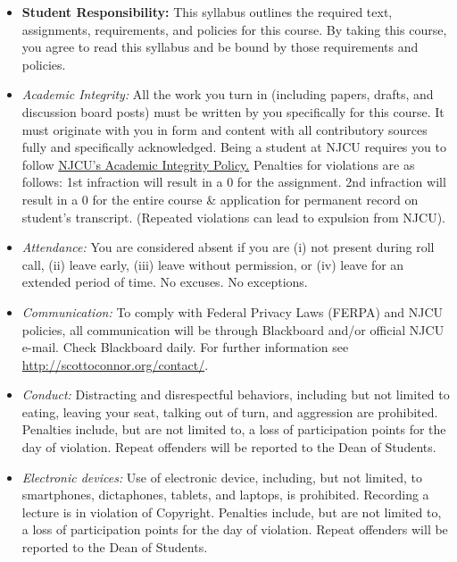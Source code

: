 \documentclass[article,oneside]{memoir}
\begin{document}
\begin{itemize}

\item \textbf{Student Responsibility:} This syllabus outlines the required text, assignments, requirements, and policies for this course. By taking this course, you agree to read this syllabus and be bound by those requirements and policies. 

 \item \textit{Academic Integrity:} All the work you turn in (including papers, drafts, and discussion board posts) must be written by you specifically for this course. It must originate with you in form and content with all contributory sources fully and specifically acknowledged. Being a student at NJCU requires you to follow \href{http://scottoconnor.org/resources/Plagiarism.pdf}{NJCU's Academic Integrity Policy.} Penalties for violations are as follows: 1st infraction will result in a 0 for the assignment.  2nd infraction will result in a 0 for the entire course \& application for permanent record on student's transcript. (Repeated violations can lead to expulsion from NJCU). 

\item \textit{Attendance:} You are considered absent if you are (i) not present during roll call, (ii) leave early, (iii) leave without permission, or (iv) leave for an extended period of time. No excuses. No exceptions.



\item \textit{Communication:} To comply with Federal Privacy Laws (FERPA) and NJCU policies, all communication will be through Blackboard and/or official NJCU e-mail. Check Blackboard daily. For further information see \href{http://scottoconnor.org/contact/}{http://scottoconnor.org/contact/}.

\item \textit{Conduct:} Distracting and disrespectful behaviors, including but not limited to eating, leaving your seat, talking out of turn, and aggression are prohibited. Penalties include, but are not limited to, a loss of participation points for the day of violation. Repeat offenders will be reported to the Dean of Students. 

\item \textit{Electronic devices:} Use of electronic device, including, but not limited, to smartphones, dictaphones, tablets, and laptops, is prohibited. Recording a lecture is in violation of Copyright. Penalties include, but are not limited to, a loss of participation points for the day of violation. Repeat offenders will be reported to the Dean of Students.


\end{itemize}
\end{document}
